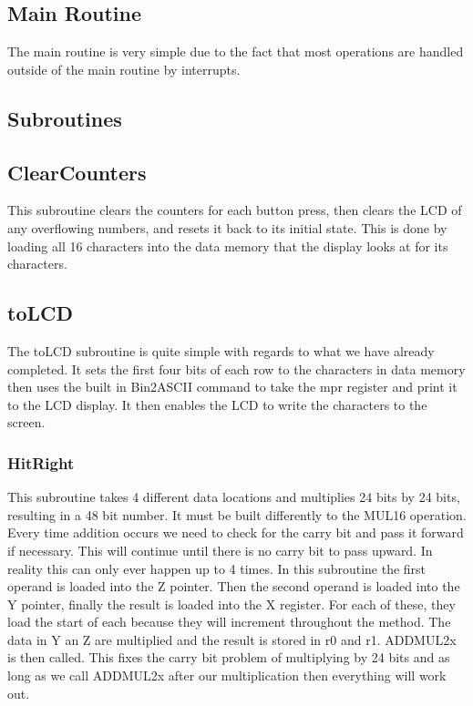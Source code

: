 \documentclass[12pt,letterpaper]{article}
\begin{document}
\subsection{Main Routine}
The main routine is very simple due to the fact that most operations are handled outside of the main routine by interrupts. 


\subsection{Subroutines}
	\subsection{ClearCounters}
	This subroutine clears the counters for each button press, then clears the LCD of any overflowing numbers, and resets it back to its initial state. This is done by loading all 16 characters into the data memory that the display looks at for its characters.  
	
	\subsection{toLCD}
	The toLCD subroutine is quite simple with regards to what we have already completed. It sets the first four bits of each row to the characters in data memory then uses the built in Bin2ASCII command to take the mpr register and print it to the LCD display. It then enables the LCD to write the characters to the screen.

	\subsubsection{HitRight}
	This subroutine takes 4 different data locations and multiplies 24 bits by 24 bits, resulting in a 48 bit number. It must be built differently to the MUL16 operation. Every time addition occurs  we need to check for the carry bit and pass it forward if necessary. This will continue until there is no carry bit to pass upward. In reality this can only ever happen up to 4 times. In this subroutine the first operand is loaded into the Z pointer. Then the second operand is loaded into the Y pointer, finally the result is loaded into the X register. For each of these, they load the start of each because they will increment throughout the method. The data in Y an Z are multiplied and the result is stored in r0 and r1. ADDMUL2x is then called. This fixes the carry bit problem of multiplying by 24 bits and as long as we call ADDMUL2x after our multiplication then everything will work out. 
	 
\end{document}
